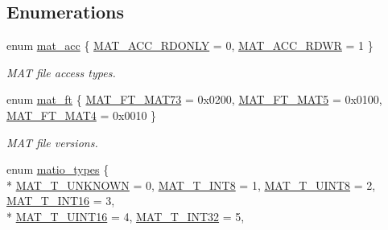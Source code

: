 \subsection*{Enumerations}
\begin{DoxyCompactItemize}
\item 
enum \hyperlink{group__MAT_gaa9dcbc70f538af79bd557593ff6b5cdb}{mat\-\_\-acc} \{ \hyperlink{group__MAT_ggaa9dcbc70f538af79bd557593ff6b5cdba8dd1457651b27ba9bea6cfba158c037c}{M\-A\-T\-\_\-\-A\-C\-C\-\_\-\-R\-D\-O\-N\-L\-Y} = 0, 
\hyperlink{group__MAT_ggaa9dcbc70f538af79bd557593ff6b5cdba0f65f27ea42fde32d62b702b82329c1f}{M\-A\-T\-\_\-\-A\-C\-C\-\_\-\-R\-D\-W\-R} = 1
 \}
\begin{DoxyCompactList}\small\item\em M\-A\-T file access types. \end{DoxyCompactList}\item 
enum \hyperlink{group__MAT_gad03442b8378999189d510e3745c702b7}{mat\-\_\-ft} \{ \hyperlink{group__MAT_ggad03442b8378999189d510e3745c702b7a765c5d1d5038947646260dc82483517e}{M\-A\-T\-\_\-\-F\-T\-\_\-\-M\-A\-T73} = 0x0200, 
\hyperlink{group__MAT_ggad03442b8378999189d510e3745c702b7a31ade1f6989411dc0299007e2c7d33b2}{M\-A\-T\-\_\-\-F\-T\-\_\-\-M\-A\-T5} = 0x0100, 
\hyperlink{group__MAT_ggad03442b8378999189d510e3745c702b7a858b4f5da65548219b1c3ad47aa478d3}{M\-A\-T\-\_\-\-F\-T\-\_\-\-M\-A\-T4} = 0x0010
 \}
\begin{DoxyCompactList}\small\item\em M\-A\-T file versions. \end{DoxyCompactList}\item 
enum \hyperlink{group__MAT_gacf7b3b879282b7ab3a51190e49bf3453}{matio\-\_\-types} \{ \\*
\hyperlink{group__MAT_ggacf7b3b879282b7ab3a51190e49bf3453a2a7318fe8bf9464935e7ed8902618293}{M\-A\-T\-\_\-\-T\-\_\-\-U\-N\-K\-N\-O\-W\-N} = 0, 
\hyperlink{group__MAT_ggacf7b3b879282b7ab3a51190e49bf3453a9807f5033ed4f9b548953742d9fd1658}{M\-A\-T\-\_\-\-T\-\_\-\-I\-N\-T8} = 1, 
\hyperlink{group__MAT_ggacf7b3b879282b7ab3a51190e49bf3453a01c1bd7db68f90552862eb5d311be408}{M\-A\-T\-\_\-\-T\-\_\-\-U\-I\-N\-T8} = 2, 
\hyperlink{group__MAT_ggacf7b3b879282b7ab3a51190e49bf3453a8c5b2e381946e95ea8d81ac216743302}{M\-A\-T\-\_\-\-T\-\_\-\-I\-N\-T16} = 3, 
\\*
\hyperlink{group__MAT_ggacf7b3b879282b7ab3a51190e49bf3453a05bc7af7680aa68be95126ae0a4c2e31}{M\-A\-T\-\_\-\-T\-\_\-\-U\-I\-N\-T16} = 4, 
\hyperlink{group__MAT_ggacf7b3b879282b7ab3a51190e49bf3453a83e06a68320726c6572bfbb9f3addb1d}{M\-A\-T\-\_\-\-T\-\_\-\-I\-N\-T32} = 5, 

\end{DoxyCompactItemize}
